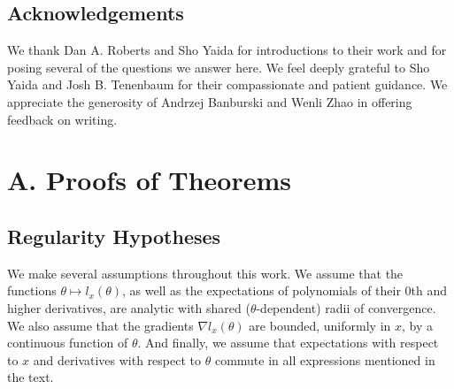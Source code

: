 \documentclass{article}
\begin{document}

\subsection{Acknowledgements}
    We thank Dan A. Roberts and Sho Yaida for introductions to their work and
    for posing several of the questions we answer here.  We feel deeply
    grateful to Sho Yaida and Josh B. Tenenbaum for their compassionate and
    patient guidance.  We appreciate the generosity of
        Andrzej Banburski
        and
        Wenli Zhao
    in offering feedback on writing.


    
    


\section*{A. Proofs of Theorems}

    \subsection*{Regularity Hypotheses}
        We make several assumptions throughout this work.  We assume that the
        functions $\theta \mapsto l_x(\theta)$, as well as the expectations of
        polynomials of their $0$th and higher derivatives, are analytic with
        shared ($\theta$-dependent) radii of convergence.  We also assume that
        the gradients $\nabla l_x(\theta)$ are bounded, uniformly in $x$, by a
        continuous function of $\theta$.  And finally, we assume that
        expectations with respect to $x$ and derivatives with respect to
        $\theta$ commute in all expressions mentioned in the text.
\end{document}
